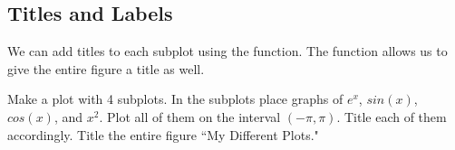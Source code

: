 \subsection*{Titles and Labels}

We can add titles to each subplot using the  function. The
 function allows us to give the entire figure a title
as well.

\begin{problem} 
Make a plot with 4 subplots. In the subplots place graphs of $e^x$,
$sin(x)$, $cos(x)$, and $x^2$. Plot all of them on the interval
$(-\pi,\pi)$. Title each of them accordingly. Title the entire figure
``My Different Plots." 
\end{problem}

